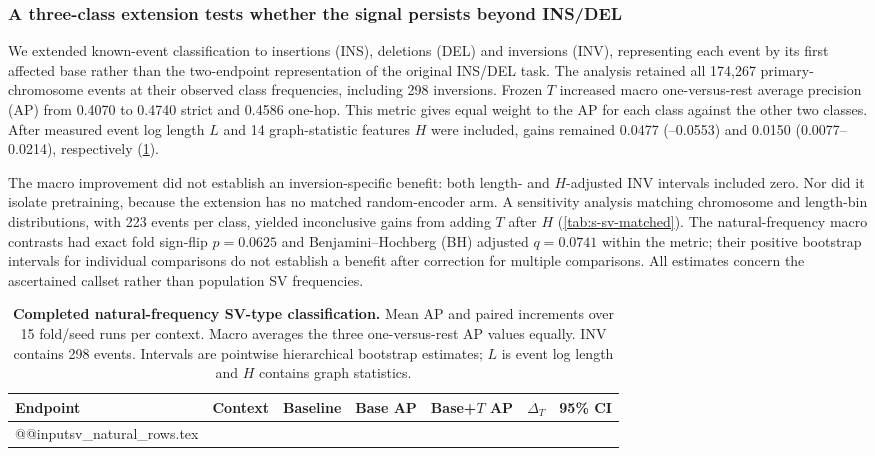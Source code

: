 \subsubsection{A three-class extension tests whether the signal persists beyond INS/DEL}
\label{sec:sv-type-extension}

We extended known-event classification to insertions (INS), deletions (DEL) and inversions (INV), representing each event by its first affected base rather than the two-endpoint representation of the original INS/DEL task. The analysis retained all 174,267 primary-chromosome events at their observed class frequencies, including 298 inversions. Frozen $T$ increased macro one-versus-rest average precision (AP) from 0.4070 to 0.4740 strict and 0.4586 one-hop. This metric gives equal weight to the AP for each class against the other two classes. After measured event log length $L$ and 14 graph-statistic features $H$ were included, gains remained 0.0477 (--0.0553) and 0.0150 (0.0077--0.0214), respectively (\cref{tab:sv-natural}).

The macro improvement did not establish an inversion-specific benefit: both length- and $H$-adjusted INV intervals included zero. Nor did it isolate pretraining, because the extension has no matched random-encoder arm. A sensitivity analysis matching chromosome and length-bin distributions, with 223 events per class, yielded inconclusive gains from adding $T$ after $H$ (\cref{tab:s-sv-matched}). The natural-frequency macro contrasts had exact fold sign-flip $p=0.0625$ and Benjamini--Hochberg (BH) adjusted $q=0.0741$ within the metric; their positive bootstrap intervals for individual comparisons do not establish a benefit after correction for multiple comparisons. All estimates concern the ascertained callset rather than population SV frequencies.

\begin{table}[ht]
\centering
\caption{\textbf{Completed natural-frequency SV-type classification.} Mean AP and paired increments over 15 fold/seed runs per context. Macro averages the three one-versus-rest AP values equally. INV contains 298 events. Intervals are pointwise hierarchical bootstrap estimates; $L$ is event log length and $H$ contains graph statistics.}
\label{tab:sv-natural}
\footnotesize
\setlength{\tabcolsep}{3pt}
\begin{tabular}{@{}lllrrrl@{}}
\toprule
Endpoint & Context & Baseline & Base AP & Base+$T$ AP & $\Delta_T$ & 95\% CI \\
\midrule
\csname @@input\endcsname sv_natural_rows.tex
\bottomrule
\end{tabular}
\end{table}
